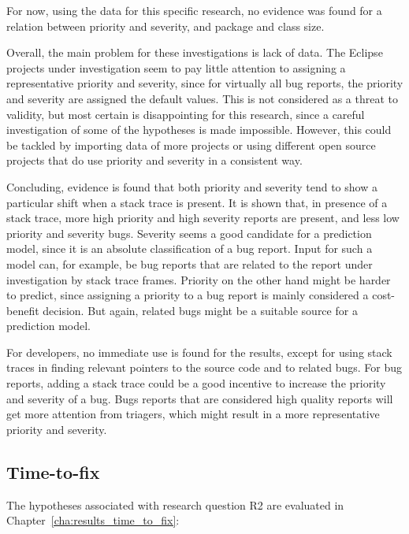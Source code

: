 For now, using the data for this specific research, no evidence was found for a relation between priority and severity, and package and class size.

Overall, the main problem for these investigations is lack of data. The Eclipse projects under investigation seem to pay little attention to assigning a representative priority and severity, since for virtually all bug reports, the priority and severity are assigned the default values. This is not considered as a threat to validity, but most certain is disappointing for this research, since a careful investigation of some of the hypotheses is made impossible. However, this could be tackled by importing data of more projects or using different open source projects that do use priority and severity in a consistent way.

Concluding, evidence is found that both priority and severity tend to show a particular shift when a stack trace is present. It is shown that, in presence of a stack trace, more high priority and high severity reports are present, and less low priority and severity bugs. Severity seems a good candidate for a prediction model, since it is an absolute classification of a bug report. Input for such a model can, for example, be bug reports that are related to the report under investigation by stack trace frames. Priority on the other hand might be harder to predict, since assigning a priority to a bug report is mainly considered a cost-benefit decision. But again, related bugs might be a suitable source for a prediction model. 

For developers, no immediate use is found for the results, except for using stack traces in finding relevant pointers to the source code and to related bugs. For bug reports, adding a stack trace could be a good incentive to increase the priority and severity of a bug. Bugs reports that are considered high quality reports will get more attention from triagers, which might result in a more representative priority and severity. 

\subsection{Time-to-fix} %
The hypotheses associated with research question R2 are evaluated in Chapter~\ref{cha:results_time_to_fix}:

\vspace{\baselineskip}
\questionb{}
\vspace{\baselineskip}

